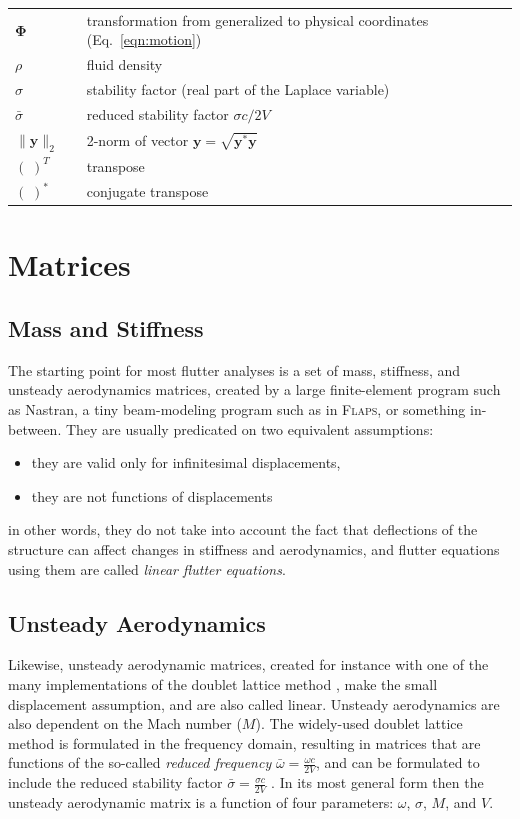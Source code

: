 \documentclass[10pt,openany,twoside]{book}
\numberwithin{equation}{section}   %
\newcommand{\Matrix}[1]{\boldsymbol{#1}}
\newcommand{\Vector}[1]{\boldsymbol{#1}}
\newcommand{\Flaps}{{\normalfont\scshape Flaps\:}}
\newcommand{\Eqn}[1]{Eq.\ \ref{#1}}
\begin{document}
\begin{small}
\begin{longtable}{@{}lcl@{}}
$\Matrix{\Phi}$ & & transformation from generalized to physical coordinates (\Eqn{eqn:motion}) \\
$\rho$ & & fluid density \\
$\sigma$ & & stability factor (real part of the Laplace variable) \\
$\bar{\sigma}$ & & reduced stability factor $\sigma c/2V$ \\
$\|\Vector{y}\|_2$ & & 2-norm of vector $\Vector{y} =
   \sqrt{\Vector{y}^*\Vector{y}}$ \index{2-norm!complex}\\
$(\;)^T$ & & transpose \\
$(\;)^*$ & & conjugate transpose \\
\end{longtable}
\end{small}

\section{Matrices}
\subsection{Mass and Stiffness}
The starting point for most flutter analyses is a set of mass,
stiffness, and unsteady aerodynamics matrices, created by
a large finite-element program such as Nastran, a tiny beam-modeling
program such as in \Flaps, or something in-between.
They are usually predicated on two equivalent assumptions:
\begin{itemize}
	\item they are valid only for infinitesimal displacements,
	\item they are not functions of displacements
\end{itemize}
in other words, they do not take into account the fact that deflections
of the structure can affect changes in stiffness and aerodynamics,
and flutter equations using them are called \emph{linear flutter equations}.

\subsection{Unsteady Aerodynamics}
Likewise, unsteady aerodynamic matrices, created for instance
with one of the many implementations of the doublet lattice method
\cite{demasi2024introduction}, make the small displacement assumption,
and are also called linear. Unsteady aerodynamics are also dependent
on the Mach number ($M$).
The widely-used doublet lattice method
is formulated in the frequency domain, resulting in matrices that
are functions of the so-called \emph{reduced frequency}
$\bar{\omega} = \frac{\omega c}{2V}$, and can be formulated to include
the reduced stability factor $\bar{\sigma} = \frac{\sigma c}{2V}$
\cite{cunningham1984generalization}.
In its most general form then the unsteady aerodynamic matrix is
a function of four parameters: $\omega$, $\sigma$, $M$, and $V$.
\end{document}
